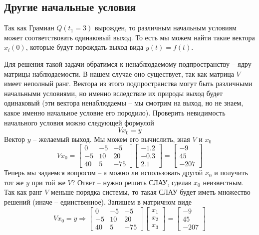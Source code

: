\documentclass[a4paper, 12pt]{article}
\begin{document}
    \subsection{Другие начальные условия}
    Так как Грамиан $Q(t_1=3)$ вырожден, то различным начальным условиям может соответствовать одинаковый выход.
    То есть мы можем найти такие вектора $x_i(0)$, которые будут порождать выход вида $y(t)=f(t)$.


    Для решения такой задачи обратимся к ненаблюдаемому подпространству -- ядру матрицы наблюдаемости. В нашем
    случае оно существует, так как матрица $V$ имеет неполный ранг. Вектора из этого подпространства могут быть
    различными начальными условиями, но именно вследствие их природы выход будет одинаковый (эти вектора ненаблюдаемы --
    мы смотрим на выход, но не знаем, какое именно начальное условие его породило). Проверить невидимость начального условия
    можно следующей формулой
    $$Vx_0=y$$
    Вектор $y$ -- желаемый выход. Мы можем его вычислить, зная $V$ и $x_0$
    $$
    Vx_0=\begin{bmatrix}
        0    &-5    &-5\\
        -5    &10    &20\\
        40     &5   &-75
    \end{bmatrix}\begin{bmatrix}
        -1.2\\
       -0.3\\
        2.1
    \end{bmatrix}=\begin{bmatrix}
    -9\\
    45\\
    -207
    \end{bmatrix}
    $$
    Теперь мы задаемся вопросом -- а можно ли использовать другой $x_0$ и получить тот же $y$ при той же $V$?
    Ответ -- нужно решить СЛАУ, сделав $x_0$ неизвестным. Так как ранг $V$ меньше порядка системы, то такая
    СЛАУ будет иметь множество решений (иначе -- единственное). Запишем в матричном виде
    $$
    Vx_0=y\Rightarrow\begin{bmatrix}
    0    &-5    &-5\\
    -5    &10    &20\\
    40     &5   &-75
\end{bmatrix}\begin{bmatrix}
x_1\\
x_2\\
x_3
\end{bmatrix}=\begin{bmatrix}
    -9\\
    45\\
    -207
    \end{bmatrix}
    $$
\end{document}
